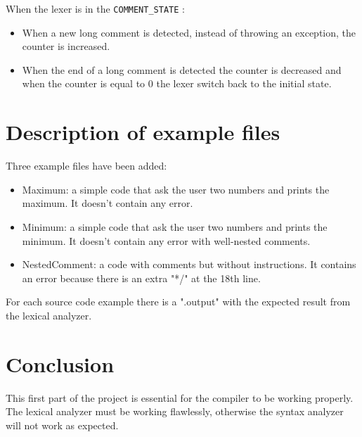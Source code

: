 \documentclass{article}
\begin{document}
When the lexer is in the \texttt{COMMENT\_STATE} :
\begin{itemize}
\item When a new long comment is detected, instead of throwing an exception, the counter is increased.\\
\item When the end of a long comment is detected the counter is decreased and when the counter is equal to $0$ the lexer switch back to the initial state.
\end{itemize}

\section{Description of example files}
Three example files have been added:
\begin{itemize}
\item Maximum: a simple code that ask the user two numbers and prints the maximum. It doesn't contain any error.
\item Minimum: a simple code that ask the user two numbers and prints the minimum. It doesn't contain any error with well-nested comments.
\item NestedComment: a code with comments but without instructions. It contains an error because there is an extra "*/" at the 18th line.
\end{itemize}

For each source code example there is a ".output" with the expected result from the lexical analyzer.

\section{Conclusion}
This first part of the project is essential for the compiler to be working properly. The lexical analyzer must be working flawlessly, otherwise the syntax analyzer will not work as expected.
\end{document}
